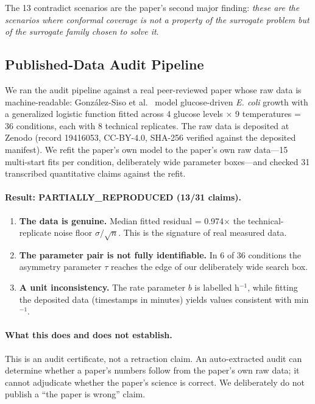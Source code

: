 \documentclass[journal]{IEEEtran}
\begin{document}
The 13 contradict scenarios are the paper's second major finding:
\textit{these are the scenarios where conformal coverage is not a property of
the surrogate problem but of the surrogate family chosen to solve it}.

\subsection{Published-Data Audit Pipeline}

We ran the audit pipeline against a real peer-reviewed paper whose raw data is
machine-readable: Gonz\'alez-Siso et al.\ \cite{gonzalezsiso2026} model
glucose-driven \textit{E. coli} growth with a generalized logistic function
fitted across 4 glucose levels $\times$ 9 temperatures = 36 conditions, each
with 8 technical replicates. The raw data is deposited at Zenodo (record
19416053, CC-BY-4.0, SHA-256 verified against the deposited manifest). We
refit the paper's own model to the paper's own raw data---15 multi-start fits
per condition, deliberately wide parameter boxes---and checked 31 transcribed
quantitative claims against the refit.

\paragraph{Result: PARTIALLY\_REPRODUCED (13/31 claims).}

\begin{enumerate}
    \item \textbf{The data is genuine.} Median fitted residual = 0.974$\times$
    the technical-replicate noise floor $\sigma/\sqrt{n}$. This is the
    signature of real measured data.
    \item \textbf{The parameter pair is not fully identifiable.} In 6 of 36
    conditions the asymmetry parameter $\tau$ reaches the edge of our
    deliberately wide search box.
    \item \textbf{A unit inconsistency.} The rate parameter $b$ is labelled
    h$^{-1}$, while fitting the deposited data (timestamps in minutes) yields
    values consistent with min$^{-1}$.
\end{enumerate}

\paragraph{What this does and does not establish.} This is an audit certificate,
not a retraction claim. An auto-extracted audit can determine whether a paper's
numbers follow from the paper's own raw data; it cannot adjudicate whether the
paper's science is correct. We deliberately do not publish a ``the paper is
wrong'' claim.
\end{document}
